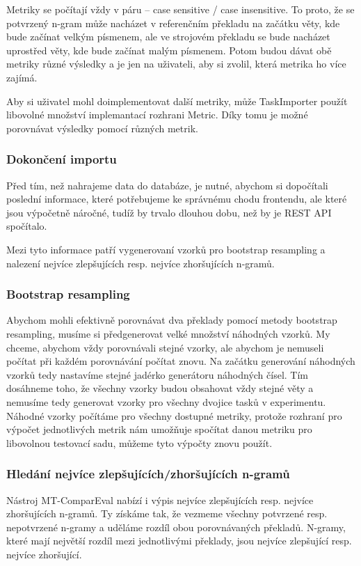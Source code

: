 Metriky se počítají vždy v páru -- case sensitive / case insensitive.
To proto, že se potvrzený n-gram může nacházet v referenčním překladu na začátku věty,
  kde bude začínat velkým písmenem,
  ale ve strojovém překladu se bude nacházet uprostřed věty,
  kde bude začínat malým písmenem.
Potom budou dávat obě metriky různé výsledky 
  a je jen na uživateli,
  aby si zvolil, která metrika ho více zajímá.

Aby si uživatel mohl doimplementovat další metriky,
  může TaskImporter použít libovolné množství implemantací rozhrani Metric.
Díky tomu je možné porovnávat výsledky pomocí různých metrik.

\subsubsection{Dokončení importu}
Před tím, než nahrajeme data do databáze, je nutné,
  abychom si dopočítali poslední informace,
  které potřebujeme ke správnému chodu frontendu,
  ale které jsou výpočetně náročné,
  tudíž by trvalo dlouhou dobu,
  než by je REST API spočítalo.

Mezi tyto informace patří vygenerovaní vzorků pro bootstrap resampling a
  nalezení nejvíce zlepšujících resp. nejvíce zhoršujících n-gramů.

\subsubsection{Bootstrap resampling}
Abychom mohli efektivně porovnávat dva překlady pomocí metody bootstrap resampling,
  musíme si předgenerovat velké množství náhodných vzorků.
My chceme,
  abychom vždy porovnávali stejné vzorky,
  ale abychom je nemuseli počítat při každém porovnávání počítat znovu.
Na začátku generování náhodných vzorků tedy nastavíme stejné jadérko generátoru náhodných čísel.
Tím dosáhneme toho,
  že všechny vzorky budou obsahovat vždy stejné věty
  a nemusíme tedy generovat vzorky pro všechny dvojice tasků v experimentu.
Náhodné vzorky počítáme pro všechny dostupné metriky,
  protože rozhraní pro výpočet jednotlivých metrik nám umožňuje spočítat danou metriku pro libovolnou testovací sadu,
  můžeme tyto výpočty znovu použít.


\subsubsection{Hledání nejvíce zlepšujících/zhoršujících n-gramů}
Nástroj MT-ComparEval nabízí i výpis nejvíce zlepšujících resp. nejvíce zhoršujících n-gramů.
Ty získáme tak, že vezmeme všechny potvrzené resp. nepotvrzené n-gramy
  a uděláme rozdíl obou porovnávaných překladů.
N-gramy,
  které mají největší rozdíl mezi jednotlivými překlady,
  jsou nejvíce zlepšující resp. nejvíce zhoršující.

